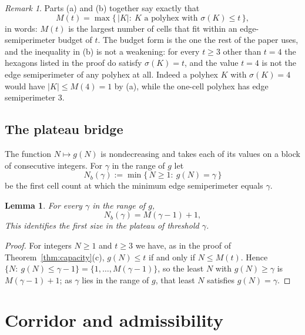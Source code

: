 \documentclass[11pt]{article}
\theoremstyle{plain}
\newtheorem{lemma}[theorem]{Lemma}
\theoremstyle{definition}
\theoremstyle{remark}
\newtheorem{remark}[theorem]{Remark}
\begin{document}
\begin{remark}\label{rem:attain}
Parts (a) and (b) together say exactly that
\[
   M(t)=\max\{\,|K|:\ K\text{ a polyhex with }\sigma(K)\le t\,\},
\]
in words: \(M(t)\) is the largest number of cells that fit within an edge-semiperimeter
budget of \(t\). The budget form is the one the rest of the paper uses, and the
inequality in (b) is not a weakening: for every \(t\ge3\) other than \(t=4\) the
hexagons listed in the proof do satisfy \(\sigma(K)=t\), and the value \(t=4\) is not the
edge semiperimeter of any polyhex at all. Indeed a polyhex \(K\) with \(\sigma(K)=4\)
would have \(|K|\le M(4)=1\) by (a), while the one-cell polyhex has edge semiperimeter
\(3\).
\end{remark}

\subsection{The plateau bridge}\label{sec:2.7}

The function \(N\mapsto g(N)\) is nondecreasing and takes each of its values on a block of
consecutive integers. For \(\gamma\) in the range of \(g\) let
\[
   N_{b}(\gamma):=\min\{\,N\ge1:\ g(N)=\gamma\,\}
\]
be the first cell count at which the minimum edge semiperimeter equals \(\gamma\).

\begin{lemma}\label{lem:bridge}
For every \(\gamma\) in the range of \(g\),
\begin{equation}\label{eq:bridge}
   N_{b}(\gamma)=M(\gamma-1)+1 ,
\end{equation}
This identifies the first size in the plateau of threshold \(\gamma\).
\end{lemma}

\begin{proof}
For integers \(N\ge1\) and \(t\ge3\) we have, as in the proof of
Theorem~\ref{thm:capacity}(c), \(g(N)\le t\) if and only if \(N\le M(t)\). Hence
\(\{N:\ g(N)\le\gamma-1\}=\{1,\dots,M(\gamma-1)\}\), so the least \(N\) with
\(g(N)\ge\gamma\) is \(M(\gamma-1)+1\); as \(\gamma\) lies in the range of \(g\), that
least \(N\) satisfies \(g(N)=\gamma\).
\end{proof}




\section{Corridor and admissibility}\label{sec:corridor}
\end{document}
